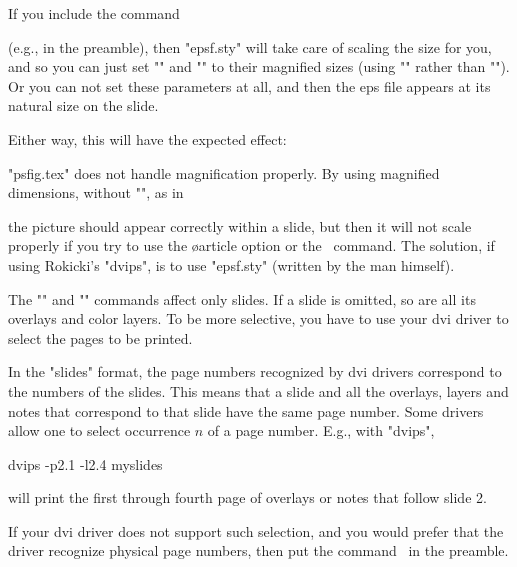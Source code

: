 If you include the command
\begin{MD}
  \espfslidesize
\end{MD}
(e.g., in the preamble), then "epsf.sty" will take care of scaling the size
for you, and so you can just set "\epsfxsize" and "\epsfysize" to their
magnified sizes (using "\setlength" rather than "\setslidelength"). Or you can
not set these parameters at all, and then the eps file  appears at its natural
size on the slide.

Either way, this will have the expected effect:
\begin{LVerbatim}
  \setlength{\epsfysize}{.8\textheight}
\end{LVerbatim}

"psfig.tex" does not handle magnification properly. By using magnified
dimensions, without "\setslidelength", as in
\begin{LVerbatim}
\end{LVerbatim}
the picture should appear correctly within a slide, but then it will not scale
properly if you try to use the \o{article} option or the \n\twoup\ command.
The solution, if using Rokicki's "dvips", is to use "epsf.sty" (written by the
man himself).


The "\onlyslides" and "\notslides" commands affect only slides. If a slide is
omitted, so are all its overlays and color layers. To be more selective, you
have to use your dvi driver to select the pages to be printed.

In the "slides" format, the page numbers recognized by dvi drivers correspond
to the numbers of the slides. This means that a slide and all the overlays,
layers and notes that correspond to that slide have the same page number. Some
drivers allow one to select occurrence $n$ of a page number. E.g., with
"dvips",
\begin{LVerbatim}
  dvips -p2.1 -l2.4 myslides
\end{LVerbatim}
will print the first through fourth page of overlays or notes that follow
slide 2.

If your dvi driver does not support such selection, and you would prefer that
the driver recognize physical page numbers, then put the command
\N\truepagenumbers\ in the preamble.


\label{Pagestyle}

